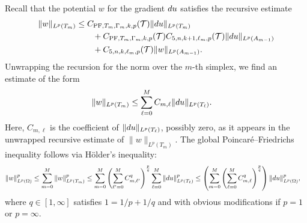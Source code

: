 \documentclass[10pt,a4paper]{article}
\begin{document}
\begin{remark}\label{remark:fullrecursivesum:exterior}
    Recall that the potential $w$ for the gradient $d u$ satisfies the recursive estimate 
    \begin{align*}
        \| w \|_{L^{p}(T_{m})}
        &
        \leq  
        C_{{\rm PF},T_{m},\Gamma_{m},k,p}({\mathcal T}) 
        \| d u      \|_{L^{p}(T_{m})} 
        \\&\qquad
        +
        C_{{\rm PF},T_{m},\Gamma_{m},k,p}({\mathcal T}) 
        C_{5,n,k+1,\ell_{m},p}({\mathcal T})
        \| d u \|_{L^{p}(A_{m-1})}
        \\&\qquad
        + 
        C_{5,n,k,\ell_{m},p}({\mathcal T}) 
        \| w \|_{L^{p}(A_{m-1})}
        .
    \end{align*}
    Unwrapping the recursion for the norm over the $m$-th simplex, 
    we find an estimate of the form 
    \begin{align}\label{math:fullrecursivesum:exterior}
        \| w \|_{L^{p}(T_{m})} 
        &
        \leq 
        \sum_{\ell=0}^{M} C_{m,\ell} \| d u \|_{L^{p}(T_{\ell})}
        .
    \end{align}
    Here, $C_{m,\ell}$ is the coefficient of $\| d u \|_{L^{p}(T_{\ell})}$, possibly zero, 
    as it appears in the unwrapped recursive estimate of $\| w \|_{L^{p}(T_{m})}$. 
    The global Poincar\'e--Friedrichs inequality follows via H\"older's inequality:
    \begin{align*}
        \| w \|_{L^{p}(\Omega)}^{p}
        &
        \leq 
        \sum_{m=0}^{M}
        \| w \|_{L^{p}(T_{m})}^{p}
        \leq 
        \sum_{m=0}^{M}
        \left( \sum_{\ell'=0}^{M} C_{m,\ell'}^{q} \right)^{\frac p q}
        \sum_{\ell=0}^{M} 
        \| d u \|_{L^{p}(T_{\ell})}^{p} 
        \leq 
        \left(
            \sum_{m=0}^{M}
            \left( \sum_{\ell=0}^{M} C_{m,\ell}^{q} \right)^{\frac p q}
        \right)
        \| d u \|_{L^{p}(\Omega)}^{p} 
        ,
    \end{align*}
    where $q \in [1,\infty]$ satisfies $1 = 1/p + 1/q$ and with obvious modifications if $p=1$ or $p=\infty$. 
\end{remark}
        
        
\end{document}
